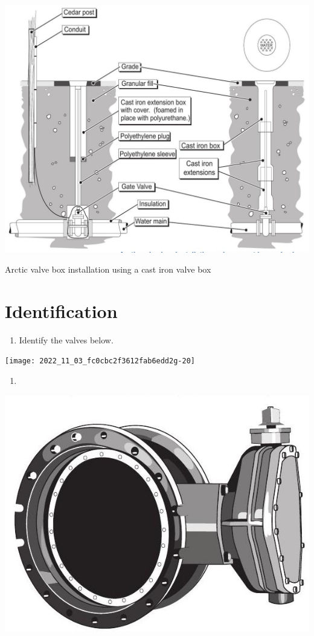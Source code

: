 \documentclass[10pt]{article}
\begin{document}
\includegraphics[max width=\textwidth]{2022_11_03_fc0cbc2f3612fab6edd2g-19}

Arctic valve box installation using a cast iron valve box

\section{Identification}
\begin{enumerate}
  \item Identify the valves below.
\end{enumerate}
\texttt{[image: 2022\_11\_03\_fc0cbc2f3612fab6edd2g-20]}

\begin{enumerate}
  \item 
\end{enumerate}
\includegraphics[max width=\textwidth]{2022_11_03_fc0cbc2f3612fab6edd2g-20(1)}
\end{document}
